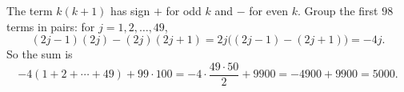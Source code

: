 The term $k(k+1)$ has sign $+$ for odd $k$ and $-$ for even $k$. Group the first $98$ terms in pairs: for $j=1,2,\dots,49$,
\[
(2j-1)(2j)-(2j)(2j+1)=2j\bigl((2j-1)-(2j+1)\bigr)=-4j .
\]
So the sum is
\[
-4(1+2+\cdots+49)+99\cdot100=-4\cdot\dfrac{49\cdot50}{2}+9900=-4900+9900=\boxed{5000}.
\]
